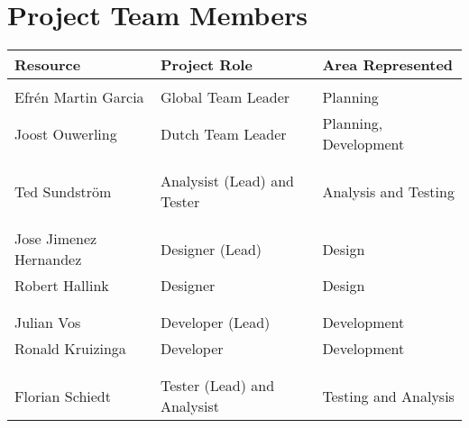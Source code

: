 \clearpage

\section{Project Team Members}

\begin{table}[h]
\begin{tabular}{lll}
\textbf{Resource} & \textbf{Project Role} & \textbf{Area Represented} \\  \hline \\

Efrén Martin Garcia & Global Team Leader & Planning \\
Joost Ouwerling & Dutch Team Leader & Planning, Development \\ \\
\hdashline \\
Ted Sundström & Analysist (Lead) and Tester & Analysis and Testing\\ \\
\hdashline \\
Jose Jimenez	Hernandez & Designer (Lead) & Design \\
Robert Hallink & Designer & Design \\ \\
\hdashline \\
Julian Vos & Developer (Lead) & Development \\
Ronald Kruizinga & Developer & Development \\ \\
\hdashline \\
Florian Schiedt &Tester (Lead) and Analysist & Testing and Analysis

\end{tabular}
\end{table}
